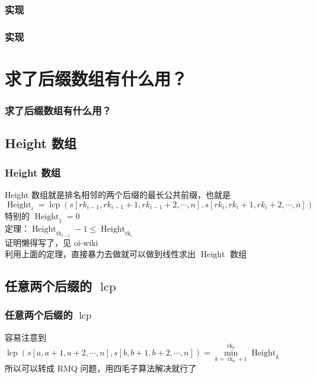 \documentclass{beamer}
\begin{document}
    \subsubsection{实现}
    \begin{frame}
        \frametitle{实现}
        \pause
        \href{https://www.luogu.com.cn/paste/1tdjoxie}{}
    \end{frame}
    \section{求了后缀数组有什么用？}
    \begin{frame}
        \frametitle{求了后缀数组有什么用？}
    \end{frame}
    \subsection{Height 数组}
    \begin{frame}
        \frametitle{Height 数组}
        \pause
        Height 数组就是排名相邻的两个后缀的最长公共前缀，也就是 $\operatorname{Height}_i=\operatorname{lcp}\left(s\left[rk_{i-1},rk_{i-1}+1,rk_{i-1}+2,\cdots,n\right],s\left[rk_i,rk_i+1,rk_i+2,\cdots,n\right]\right)$\\
        \pause
        特别的 $\operatorname{Height}_1=0$\\
        \pause
        定理：$\operatorname{Height}_{\operatorname{rk}_{i-1}}-1\leq\operatorname{Height}_{\operatorname{rk}_i}$\\
        \pause
        证明懒得写了，见 oi-wiki\\
        \pause
        利用上面的定理，直接暴力去做就可以做到线性求出 $\operatorname{Height}$ 数组
    \end{frame}
    \subsection{任意两个后缀的 $\operatorname{lcp}$}
    \begin{frame}
        \frametitle{任意两个后缀的 $\operatorname{lcp}$}
        \pause
        容易注意到 $\operatorname{lcp}\left(s\left[a,a+1,a+2,\cdots,n\right],s\left[b,b+1,b+2,\cdots,n\right]\right)=\min\limits_{k=\operatorname{rk}_a+1}^{\operatorname{rk}_b}\operatorname{Height}_k$\\
        \pause
        所以可以转成 RMQ 问题，用四毛子算法解决就行了
    \end{frame}
\end{document}
